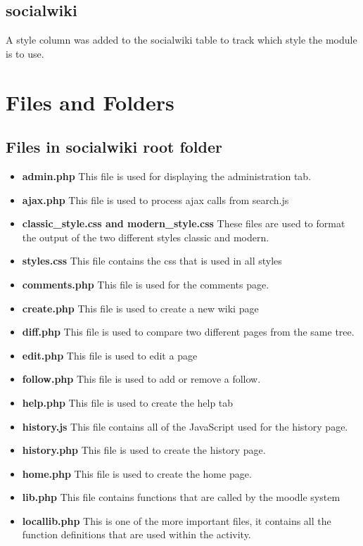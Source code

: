 \documentclass[letterpaper,twoside,11pt]{article}
\begin{document}
	\subsection{socialwiki}
	A style column was added to the socialwiki table to track which style the module is to use.
	
\section{Files and Folders}
\subsection{Files in socialwiki root folder}
\begin{itemize}
	\item \textbf{admin.php}
	This file is used for displaying the administration tab.
	\item \textbf{ajax.php}
	This file is used to process ajax calls from search.js
	\item \textbf{classic\_style.css and modern\_style.css}
	These files are used to format the output of the two different styles classic and modern.
	\item \textbf{styles.css}
	This file contains the css that is used in all styles
	\item \textbf{comments.php}
	This file is used for the comments page.
	\item \textbf{create.php}
	This file is used to create a new wiki page
	\item \textbf{diff.php}
	This file is  used to compare two different pages from the same tree.
	\item \textbf{edit.php}
	This file is used to edit a page
	\item \textbf{follow.php}
	This file is used to add or remove a follow.
	\item \textbf{help.php}
	This file is used to create the help tab
	\item \textbf{history.js}
	This file contains all of the JavaScript used for the history page.
	\item \textbf{history.php}
	This file is used to create the history page.
	\item \textbf{home.php}
	This file is used to create the home page.
	\item \textbf{lib.php}
	This file contains functions that are called by the moodle system
	\item \textbf{locallib.php}
	This is one of the more important files, it contains all the function definitions that are used within the activity.

\end{itemize}
\end{document}
